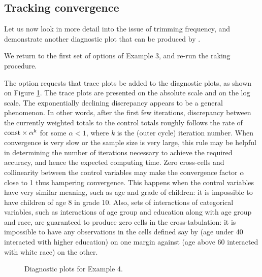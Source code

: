 \subsection{Tracking convergence}
\label{subsec:example:trace}

Let us now look in more detail into the issue of trimming frequency,
and demonstrate another diagnostic plot that can be produced by
.

\begin{stexample}[Example 4]

We return to the first set of options of Example 3, and
re-run the raking procedure.

\begin{stlog}
\nullskip
\end{stlog}

The option  requests that trace plots be added to
the diagnostic plots, as shown on Figure \ref{fig:example4:sometimes}.
The trace plots are presented on the absolute scale and on the log scale.
The exponentially declining discrepancy appears to be a general phenomenon.
In other words, after the first few iterations,
discrepancy between the currently weighted totals to the control totals roughly follows
the rate of $\rm{const} \times \alpha^k$ for some $\alpha<1$, where $k$ is
the (outer cycle) iteration number. When convergence is very slow or the sample
size is very large, this rule may be helpful in determining the number
of iterations necessary to achieve the required accuracy, and hence
the expected computing time. Zero cross-cells and collinearity between
the control variables may make the convergence factor $\alpha$ close to 1 thus
hampering convergence. This happens when the control variables have
very similar meaning, such as age and grade of children: it is impossible
to have children of age 8 in grade 10.
Also, sets of interactions of categorical variables, such as interactions
of age group and education along with age group and race, are guaranteed to
produce zero cells in the cross-tabulation: it is impossible to have
any observations in the cells defined say by
(age under 40 interacted with higher education) on one margin against
(age above 60 interacted with white race) on the other.

\begin{figure}[!th]
\begin{center}
\end{center}
\caption{Diagnostic plots for Example 4.}
\label{fig:example4:sometimes}
\end{figure}


\end{stexample}
